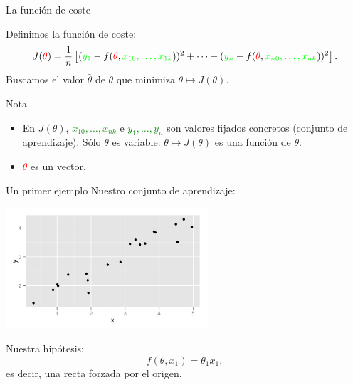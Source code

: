\documentclass[aspectratio=169]{beamer}
\begin{document}
\begin{frame}{La función de coste}
\begin{overlayarea}{\textwidth}{4cm}
Definimos la función de coste: 
$$J(\textcolor{red}{\theta})=\frac 1 n \left[(\textcolor{green}{y_1}-f(\textcolor{red}{\theta},\textcolor{green}{x_{10},\ldots,x_{1k}}))^2+\cdots+(\textcolor{green}{y_n}-f(\textcolor{red}{\theta},\textcolor{green}{x_{n0},\ldots,x_{nk}}))^2\right].$$
Buscamos el valor $\hat\theta$ de $\theta$ que minimiza $\theta\mapsto J(\theta)$.
\begin{block}{Nota}
  \begin{itemize}
  \item   En $J(\theta)$, \textcolor{green}{$x_{10},\ldots,x_{nk}$} e
    \textcolor{green}{$y_1,\ldots,y_n$} son valores fijados concretos
    (conjunto de aprendizaje).  Sólo \alert{$\theta$} es variable:
    $\theta\mapsto J(\theta)$ es una función de $\theta$.
  \item \textcolor{red}{$\theta$} es un vector.
  \end{itemize}
\end{block}
\end{overlayarea}
\end{frame}

\begin{frame}{Un primer ejemplo}
Nuestro conjunto de aprendizaje:
\begin{center}
  \includegraphics[height=4.5cm]{rectaorigen.png}
\end{center}
   Nuestra hipótesis: $$f(\theta,x_1)=\theta_1x_1,$$
es decir, una recta forzada por el origen.
\end{frame}
\end{document}
